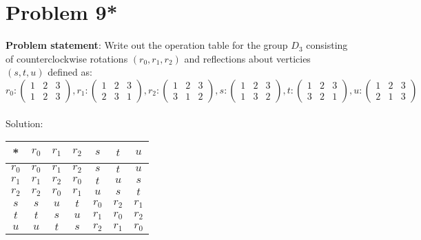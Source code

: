 \documentclass{article} %
\begin{document}
\newpage

\section*{Problem 9*}


\textbf{Problem statement}: Write out the operation table for the group $D_3$ consisting of counterclockwise rotations $(r_0, r_1, r_2)$ and reflections about verticies $(s, t, u)$ defined as:
\[r_0:  \left( \begin{matrix} 1 & 2 & 3 \\ 1 & 2 & 3 \end{matrix} \right), 
  r_1:  \left( \begin{matrix} 1 & 2 & 3 \\ 2 & 3 & 1 \end{matrix} \right), 
  r_2:  \left( \begin{matrix} 1 & 2 & 3 \\ 3 & 1 & 2 \end{matrix} \right),
  s:      \left( \begin{matrix} 1 & 2 & 3 \\ 1 & 3 & 2 \end{matrix} \right), 
  t:       \left( \begin{matrix} 1 & 2 & 3 \\ 3 & 2 & 1 \end{matrix} \right), 
  u:      \left( \begin{matrix} 1 & 2 & 3 \\ 2 & 1 & 3 \end{matrix} \right) \]
\\

Solution: 
\begin{addmargin}[1em]{0em}
\begin{tabular}{c | c c c c c c}
* & $r_0$ & $r_1$ & $r_2$ & $s$ & $t$ & $u$ \\ \hline
$r_0$ & $r_0$ & $r_1$ & $r_2$ & $s$ & $t$ & $u$ \\
$r_1$ & $r_1$ & $r_2$ & $r_0$ & $t$ & $u$ & $s$\\
$r_2$ & $r_2$ & $r_0$ & $r_1$ & $u$ & $s$ & $t$\\
$s$    & $s$ & $u$ & $t$ & $r_0$ & $r_2$ & $r_1$\\
$t$     & $t$ & $s$ & $u$ & $r_1$ & $r_0$ & $r_2$\\
$u$    & $u$ & $t$ & $s$ & $r_2$ & $r_1$ & $r_0$
\end{tabular}
\end{addmargin}
\end{document}
